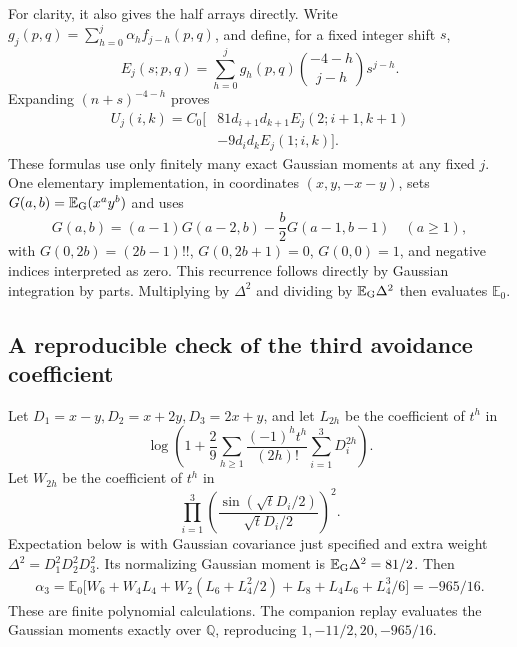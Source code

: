 \documentclass[11pt,letterpaper]{article}
\theoremstyle{remark}\newtheorem{remark}[theorem]{Remark}
\numberwithin{equation}{section}
\newcommand{\E}{\mathbb E}
\begin{document}
For clarity, it also gives the half arrays directly. Write
$g_j(p,q)=\sum_{h=0}^j\alpha_h f_{j-h}(p,q)$, and define, for a fixed
integer shift $s$,
\[
E_j(s;p,q)=\sum_{h=0}^j g_h(p,q)
 \binom{-4-h}{j-h}s^{j-h}.
\]
Expanding $(n+s)^{-4-h}$ proves
\begin{equation}\label{upo:all:eq:Aalgorithm}
\begin{split}
U_j(i,k)=C_0\bigl[&81d_{i+1}d_{k+1}E_j(2;i+1,k+1)\\
 &-9d_id_kE_j(1;i,k)\bigr].
\end{split}
\end{equation}
These formulas use only finitely many exact Gaussian moments at any
fixed $j$. One elementary implementation, in coordinates $(x,y,-x-y)$,
sets $G(a,b)=\E_{\rm G}(x^ay^b)$ and uses
\[
G(a,b)=(a-1)G(a-2,b)-\frac b2G(a-1,b-1)\quad(a\ge1),
\]
with $G(0,2b)=(2b-1)!!$, $G(0,2b+1)=0$, $G(0,0)=1$, and negative
indices interpreted as zero. This recurrence follows directly by
Gaussian integration by parts. Multiplying by $\Delta^2$ and dividing
by $\E_{\rm G}\Delta^2$ then evaluates $\E_0$.
\subsection{A reproducible check of the third avoidance coefficient}
Let $D_1=x-y,D_2=x+2y,D_3=2x+y$, and let $L_{2h}$ be the coefficient
of $t^h$ in
\[
\log\left(1+\frac29\sum_{h\ge1}
 \frac{(-1)^ht^h}{(2h)!}\sum_{i=1}^3D_i^{2h}\right).
\]
Let $W_{2h}$ be the coefficient of $t^h$ in
\[
\prod_{i=1}^3\left(\frac{\sin(\sqrt tD_i/2)}{\sqrt tD_i/2}\right)^2.
\]
Expectation below is with Gaussian covariance just specified and extra
weight $\Delta^2=D_1^2D_2^2D_3^2$. Its normalizing Gaussian moment is
$\E_{\rm G}\Delta^2=81/2$. Then
\begin{align*}
\alpha_3=\E_0\bigl[W_6+W_4L_4+W_2(L_6+L_4^2/2)
 +L_8+L_4L_6+L_4^3/6\bigr]=-965/16.
\end{align*}
These are finite polynomial calculations. The companion replay evaluates the Gaussian moments exactly over
$\mathbb Q$, reproducing $1,-11/2,20,-965/16$.
\end{document}
